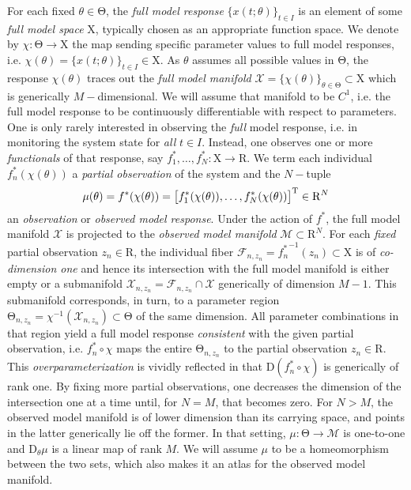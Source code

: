 \documentclass{article}
\newcommand{\D}{\mathrm{D}}
\newcommand{\p}{\theta}
\newcommand{\fmr}{\chi}
\newcommand{\fmm}{\mathcal{X}}
\newcommand{\fiber}{\mathcal{F}}
\newcommand{\omr}{\mu}
\newcommand{\omm}{\mathcal{M}}
\newcommand{\R}{\mathrm{R}}
\newcommand{\ps}{\mathrm{\Theta}}
\newcommand{\fms}{\mathrm{X}}
\begin{document}
For each fixed $\p\in\ps$, the \emph{full model response}
$\{x(t;\p) \}_{t \in I}$ is an element of some \emph{full model space}
$\fms$, typically chosen as an appropriate function space.  We denote
by $\fmr : \ps \to \fms$ the map sending specific parameter values to
full model responses, i.e.
$\fmr(\p) = \{ x(t;\p) \}_{t \in I} \in \fms$.  As $\p$ assumes all
possible values in $\ps$, the response $\fmr(\p)$ traces out the
\emph{full model manifold} $\fmm =
\{ \fmr(\p) \}_{\p \in \ps}
\subset
\fms$
which is  generically $M-$dimensional.
We will assume that manifold to be $C^1$,
i.e. the full model response to be continuously differentiable
with respect to parameters.\\

One is only rarely interested in observing the \emph{full} model
response, i.e. in monitoring the system state for \emph{all}
$t \in I$.  Instead, one observes one or more \emph{functionals} of
that response, say $f^*_1 , \ldots , f^*_N : \fms \to \R$.  We term
each individual $f^*_n(\fmr(\p))$ a \emph{partial observation} of the
system and the $N-$tuple
%
\[
 \mu(\p)
=
 f^*(\fmr(\p))
=
 \big[f^*_1(\fmr(\p)) , \ldots , f^*_N(\fmr(\p))\big]^{\rm T}
\in
 \R^N
\]
%
an \emph{observation} or \emph{observed model response}.
Under the action of $f^*$,
the full model manifold $\fmm$ is projected to
the \emph{observed model manifold} $\omm \subset \R^N$.
For each \emph{fixed} partial observation $z_n \in \R$,
the individual fiber $\fiber_{n,z_n} = {f^*_n}^{-1}(z_n) \subset \fms$
is of \emph{co-dimension one}
and hence its intersection with the full model manifold
is either empty or a submanifold $\fmm_{n,z_n} = \fiber_{n,z_n} \cap \fmm$
generically of dimension $M-1$.
This submanifold corresponds, in turn, to a parameter region
$\ps_{n,z_n} = \fmr^{-1}(\fmm_{n,z_n}) \subset \ps$ of the same dimension.
All parameter combinations in that region yield a full model response
\emph{consistent} with the given partial observation,
i.e. $f^*_n\circ\fmr$ maps the entire $\ps_{n,z_n}$
to the partial observation $z_n\in\R$.
This \emph{overparameterization} is vividly reflected
in that $\D (f^*_n\circ\fmr)$ is generically of rank one.
By fixing more partial observations,
one decreases the dimension of the intersection one at a time
until, for $N=M$, that becomes zero.
For $N > M$, the observed model manifold
is of lower dimension than its carrying space,
and points in the latter generically lie off the former.
In that setting, $\omr : \ps \to \omm$ is one-to-one
and $\D_\p \omr$ is a linear map of rank $M$.
We will assume $\omr$ to be a homeomorphism between the two sets,
which also makes it an atlas for the observed model manifold.
\end{document}
